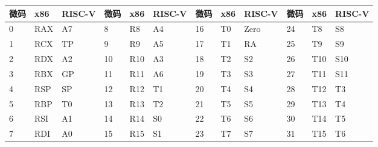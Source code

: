 \begin{table}[!htbp]
  \centering
  \label{tab:reg_map}
  \footnotesize%
  \setlength{\tabcolsep}{4pt}%
  \renewcommand{\arraystretch}{1.2}%
      \begin{tabular}{lll|lll|lll|lll}
  \hline
  微码                        & x86                         & RISC-V                     & 微码                         & x86                         & RISC-V                     & 微码 & x86 & RISC-V & 微码 & x86 & RISC-V \\ \hline
  \cellcolor[HTML]{FFCC67}0 & \cellcolor[HTML]{FFCC67}RAX & \cellcolor[HTML]{FFCC67}A7 & \cellcolor[HTML]{FFCC67}8  & \cellcolor[HTML]{FFCC67}R8  & \cellcolor[HTML]{FFCC67}A4 & 16 & T0  & Zero   & 24 & T8  & S8     \\
  1                         & RCX                         & TP                         & \cellcolor[HTML]{FFCC67}9  & \cellcolor[HTML]{FFCC67}R9  & \cellcolor[HTML]{FFCC67}A5 & 17 & T1  & RA     & 25 & T9  & S9     \\
  \cellcolor[HTML]{FFCC67}2 & \cellcolor[HTML]{FFCC67}RDX & \cellcolor[HTML]{FFCC67}A2 & \cellcolor[HTML]{FFCC67}10 & \cellcolor[HTML]{FFCC67}R10 & \cellcolor[HTML]{FFCC67}A3 & 18 & T2  & S2     & 26 & T10 & S10    \\
  3                         & RBX                         & GP                         & 11                         & R11                         & A6                         & 19 & T3  & S3     & 27 & T11 & S11    \\
  4                         & RSP                         & SP                         & 12                         & R12                         & T1                         & 20 & T4  & S4     & 28 & T12 & T3     \\
  5                         & RBP                         & T0                         & 13                         & R13                         & T2                         & 21 & T5  & S5     & 29 & T13 & T4     \\
  \cellcolor[HTML]{FFCC67}6 & \cellcolor[HTML]{FFCC67}RSI & \cellcolor[HTML]{FFCC67}A1 & 14                         & R14                         & S0                         & 22 & T6  & S6     & 30 & T14 & T5     \\
  \cellcolor[HTML]{FFCC67}7 & \cellcolor[HTML]{FFCC67}RDI & \cellcolor[HTML]{FFCC67}A0 & 15                         & R15                         & S1                         & 23 & T7  & S7     & 31 & T15 & T6     \\ \hline
  \end{tabular}
\end{table}

